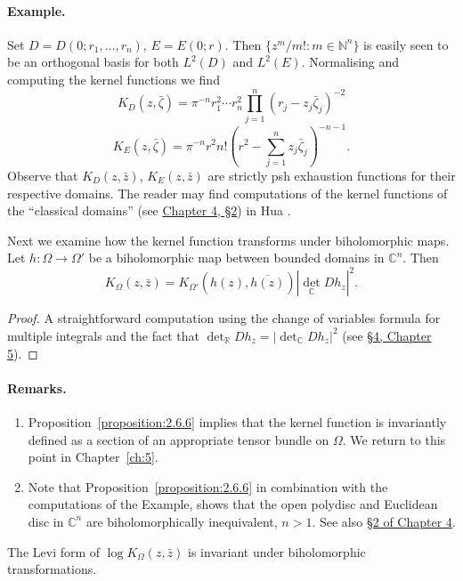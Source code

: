 \paragraph*{Example.} Set $D=D(0;r_1,\ldots,r_n)$, $E=E(0;r)$. Then $\{z^m/m!:m\in\mathbb N^n\}$ is easily seen to be an orthogonal basis for both $L^2(D)$ and $L^2(E)$. Normalising and computing the kernel functions we find
\[K_D(z,\bar\zeta)=\pi^{-n}r_1^2\cdots r_n^2\prod_{j=1}^n(r_j-z_j\bar\zeta_j)^{-2}\]
\[K_E(z,\bar\zeta)=\pi^{-n}r^2n!\left(r^2-\sum_{j=1}^n z_j\bar\zeta_j\right)^{-n-1}.\]
Observe that $K_D(z,\bar z)$, $K_E(z,\bar z)$ are strictly psh exhaustion functions for their respective domains. The reader may find computations of the kernel functions of the ``classical domains'' (see \hyperref[sec:4:2]{Chapter 4, \S2}) in Hua \cite{bib:I:hua-l-k:1}.

Next we examine how the kernel function transforms under biholomorphic maps.
 Let $h:\Omega\to\Omega'$ be a biholomorphic map between bounded domains in $\mathbb C^n$. Then
\[K_\Omega(z,\bar z)=K_{\Omega'}(h(z),\overline{h(z)})|\det_{\mathbb C}Dh_z|^2.\]
\begin{proof}
A straightforward computation using the change of variables formula for multiple integrals and the fact that $\det_{\mathbb R}Dh_z=|\det_{\mathbb C}Dh_z|^2$ (see \hyperref[sec:5:4]{\S4, Chapter 5}).
\end{proof}
\paragraph*{Remarks.}
\begin{enumerate}
\item Proposition~\ref{proposition:2.6.6} implies that the kernel function is invariantly defined as a section of an appropriate tensor bundle on $\Omega$. We return to this point in Chapter~\ref{ch:5}.
\setcounter{enumi}{2}
\item Note that Proposition~\ref{proposition:2.6.6} in combination with the computations of the Example, shows that the open polydisc and Euclidean disc in $\mathbb C^n$ are biholomorphically inequivalent, $n>1$. See also \hyperref[sec:4:2]{\S2 of Chapter 4}.
\end{enumerate}
 The Levi form of $\log K_\Omega(z,\bar z)$ is invariant under biholomorphic transformations.

